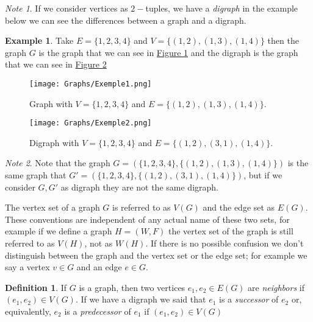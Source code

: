 \documentclass[12pt,a4paper]{book}
\theoremstyle{plain}
\theoremstyle{definition}
\newtheorem{definition}{Definition}
\newtheorem{example}{Example}
\theoremstyle{remark}
\newtheorem{note}{Note}
\begin{document}
\begin{note}
 If we consider vertices as $2-$tuples, we have a \emph{digraph} in the example below we can see the differences between a 
graph and a digraph.
\end{note}

\begin{example}
 Take $E=\{1,2,3,4 \}$ and $V= \{ (1,2) , (1,3) , (1,4) \} $ then the graph $G$ is the graph that we can see in \hyperlink{Grafexemple1}{Figure \ref{Grafexemple1}}
and the digraph is the graph that we can see in  \hyperlink{Digrafexemple1}{Figure \ref{Digrafexemple1}}

\begin{figure}[h!]
 \centering
\texttt{[image: Graphs/Exemple1.png]}
\caption{Graph with $V=\{1,2,3,4 \}$ and $E=\{(1,2),(1,3),(1,4)\}$.}\label{Grafexemple1} \hypertarget{Grafexemple1}{}
\end{figure}

\begin{figure}[h!]
  \centering
\texttt{[image: Graphs/Exemple2.png]}
\caption{Digraph with $V=\{1,2,3,4 \}$ and $E=\{(1,2),(3,1),(1,4)\}$.}\label{Digrafexemple1} \hypertarget{Digrafexemple1}{}
\end{figure}

\end{example}

\begin{note}
 Note that the graph $G=(\{ 1,2,3,4 \} , \{ (1,2), (1,3), (1,4) \}) $ is the same graph that $G' = ( \{ 1,2,3,4 \}, \{ (1,2), (3,1), (1,4) \} )$, 
but if we consider $G, G'$ as digraph they are not the same digraph.
\end{note}

The vertex set of a graph $G$ is referred to as $V(G)$ and the edge set as $E(G)$. These conventions are independent of any actual name 
of these two sets, for example if we define a graph $H=(W,F)$ the vertex set of the graph is still referred to as $V(H)$, not as $W(H)$.
If there is no possible confusion we don't distinguish between the graph and the vertex set or the edge set; for example we say a vertex 
$v \in G$ and an edge $e \in G$. 

\begin{definition}
If $G$ is a graph, then two vertices $e_1, e_2 \in E(G)$ are \emph{neighbors} if $(e_1, e_2) \in V(G)$. If we have a digraph we said that 
$e_1$ is a \emph{successor} of $e_2$ or, equivalently, $e_2$ is a \emph{predecessor} of $e_1$ if $(e_1, e_2) \in V(G)$ 
\end{definition}
\end{document}
